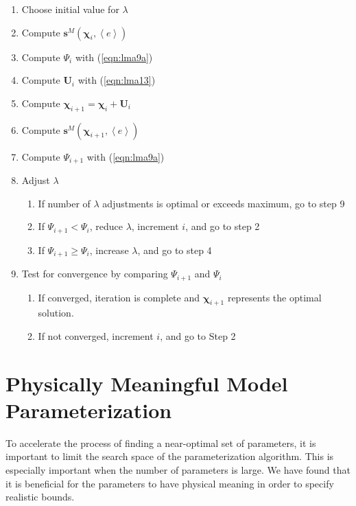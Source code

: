 \begin{enumerate}
\item Choose initial value for $\lambda$
\item Compute $\mathbf{s}^M \left(\boldsymbol{\chi}_i, \left< e \right>\right)$
\item Compute $\Psi_i$ with (\ref{eqn:lma9a})
\item Compute $\mathbf{U}_i$ with (\ref{eqn:lma13})
\item Compute $\boldsymbol{\chi}_{i+1}=\boldsymbol{\chi}_i+\mathbf{U}_i$
\item Compute $\mathbf{s}^M \left(\boldsymbol{\chi}_{i+1}, \left< e \right>\right)$
\item Compute $\Psi_{i+1}$ with (\ref{eqn:lma9a})
\item Adjust $\lambda$
\begin{enumerate}
\item If number of $\lambda$ adjustments is optimal or exceeds maximum, go to step 9
\item If $\Psi_{i+1} < \Psi_i$, reduce $\lambda$, increment $i$, and go to step 2
\item If $\Psi_{i+1} \geq \Psi_i$, increase $\lambda$, and go to step 4
\end{enumerate}
\item Test for convergence by comparing $\Psi_{i+1}$ and $\Psi_i$
\begin{enumerate}
\item If converged, iteration is complete and $\boldsymbol{\chi}_{i+1}$ represents the optimal solution.
\item If not converged, increment $i$, and go to Step 2
\end{enumerate}
\end{enumerate}

\section{Physically Meaningful Model Parameterization}

To accelerate the process of finding a near-optimal set of parameters, it is important to limit the search space of the parameterization algorithm. This is especially important when the number of parameters is large. We have found that it is beneficial for the parameters to have physical meaning in order to specify realistic bounds.

